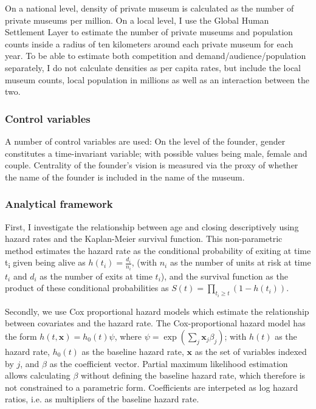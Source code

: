 \documentclass[12pt]{article}
\begin{document}
On a national level, density of private museum is calculated as the number of private museums per million.
On a local level, I use the Global Human Settlement Layer \parencite{EC_2023_GHSL} to estimate the number of private museums and population counts inside a radius of ten kilometers around each private museum for each year.
To be able to estimate both competition and demand/audience/population separately, I do not calculate densities as per capita rates, but include the local museum counts, local population in millions as well as an interaction between the two.

\subsubsection*{Control variables}


\bigbreak
\noindent
A number of control variables are used: 
On the level of the founder, gender constitutes a time-invariant variable; with possible values being male, female and couple.
Centrality of the founder's vision is measured via the proxy of whether the name of the founder is included in the name of the museum.








\subsubsection*{Analytical framework}



First, I investigate the relationship between age and closing descriptively using hazard rates and the Kaplan-Meier survival function.
This non-parametric method estimates the hazard rate as the conditional probability of exiting at time t\textsubscript{i} given being alive as \(h(t_i) = \frac{d_i}{n_i}\), (with \(n_i\) as the number of units at risk at time \(t_i\) and \(d_i\) as the number of exits at time \(t_i\)), and the survival function as the product of these conditional probabilities as \(S(t) = \prod_{t_i \geq t} \left(1-h(t_i) \right)\).



Secondly, we use Cox proportional hazard models which estimate the relationship between covariates and the hazard rate.
The Cox-proportional hazard model has the form \(h(t,\mathbf{x}) = h_0(t) \psi\), where \(\psi = \exp(\sum_{j} \mathbf{x}_j \beta_j)\); with \(h(t)\) as the hazard rate, \(h_0(t)\) as the baseline hazard rate, \(\mathbf{x}\) as the set of variables indexed by \(j\), and \(\beta\) as the coefficient vector.
Partial maximum likelihood estimation allows calculating \(\beta\) without defining the baseline hazard rate, which therefore is not constrained to a parametric form. 
Coefficients are interpeted as log hazard ratios, i.e. as multipliers of the baseline hazard rate. 
\end{document}
